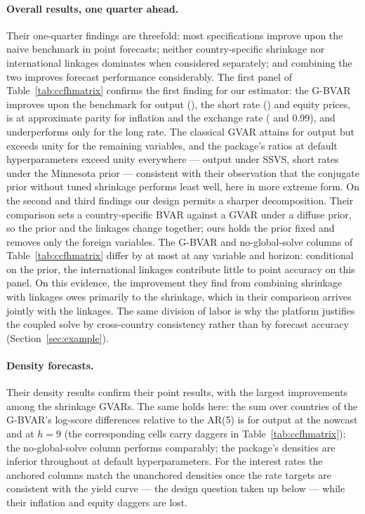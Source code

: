 \paragraph{Overall results, one quarter ahead.} Their one-quarter findings are threefold:
most specifications improve upon the naive benchmark in point forecasts; neither
country-specific shrinkage nor international linkages dominates when considered
separately; and combining the two improves forecast performance considerably. The first
panel of Table~\ref{tab:ccfhmatrix} confirms the first finding for our estimator: the
G-BVAR improves upon the benchmark for output (\CmGbvarYHOne{}), the short rate
(\CmGbvarRHOne{}) and equity prices, is at approximate parity for inflation and the
exchange rate (\CmGbvarDpHOne{} and 0.99), and underperforms only for the long rate. The
classical GVAR attains \CmToolboxYHOne{} for output but exceeds unity for the remaining
variables, and the package's ratios at default hyperparameters exceed unity everywhere
--- output \CmSsvsYHOne{} under SSVS, short rates \CmMnRHOne{} under the Minnesota prior
--- consistent with their observation that the conjugate prior without tuned shrinkage
performs least well, here in more extreme form. On the second and third findings our
design permits a sharper decomposition. Their comparison sets a country-specific BVAR
against a GVAR under a diffuse prior, so the prior and the linkages change together; ours
holds the prior fixed and removes only the foreign variables. The G-BVAR and
no-global-solve columns of Table~\ref{tab:ccfhmatrix} differ by at most
\CmStarsNostarsGap{} at any variable and horizon: conditional on the prior, the
international linkages contribute little to point accuracy on this panel. On this
evidence, the improvement they find from combining shrinkage with linkages owes primarily
to the shrinkage, which in their comparison arrives jointly with the linkages. The same
division of labor is why the platform justifies the coupled solve by cross-country
consistency rather than by forecast accuracy (Section~\ref{sec:example}).

\paragraph{Density forecasts.} Their density results confirm their point results, with
the largest improvements among the shrinkage GVARs. The same holds here: the sum over
countries of the G-BVAR's log-score differences relative to the AR(5) is
\CmGbvarYLpsHOne{} for output at the nowcast and \CmGbvarYLpsHNine{} at $h=9$ (the
corresponding cells carry daggers in Table~\ref{tab:ccfhmatrix}); the no-global-solve
column performs comparably; the package's densities are inferior throughout at default
hyperparameters. For the interest rates the anchored columns match the unanchored
densities once the rate targets are consistent with the yield curve --- the design
question taken up below --- while their inflation and equity daggers are lost.

